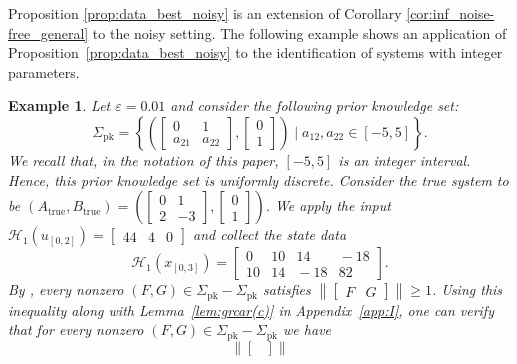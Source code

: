 \documentclass[journal,twoside,web]{ieeecolor}
\newcommand{\set}[2]{\left\{#1 \mid #2\right\}}
\newcommand{\norm}[1]{\left\|#1\right\|}
\newtheorem{example}[theorem]{Example}
\begin{document}
Proposition \ref{prop:data_best_noisy} is an extension of Corollary \ref{cor:inf_noise-free_general} to the noisy setting. The following example shows an application of Proposition~\ref{prop:data_best_noisy} to the identification of systems with integer parameters. 

\begin{example}
\label{ex:UED_noisy_unique}
Let $\varepsilon=0.01$ and consider the following prior knowledge set:
\begin{equation}
\Sigma_\text{pk}=\set{\left(\begin{bmatrix}
0 & 1  \\
a_{21} & a_{22} 
\end{bmatrix},\begin{bmatrix}
0 \\ 1
\end{bmatrix}\right)}{a_{12},a_{22}\in[-5,5]}.
\end{equation}
We recall that, in the notation of this paper, $[-5,5]$ is an integer interval. Hence, this prior knowledge set is uniformly discrete. Consider the true system to be \mbox{$(A_\text{true},B_\text{true})=\left(\begin{bmatrix}
0 & 1  \\
2 & -3 
\end{bmatrix},\begin{bmatrix}
0 \\ 1
\end{bmatrix}\right)$}. We apply the input $\mathcal{H}_1(u_{[0,2]})\!=\!\begin{bmatrix}
44 \!&\! 4 \!&\! 0
\end{bmatrix}$ and collect the state data
\begin{equation}
\mathcal{H}_1(x_{[0,3]})\!=\!\begin{bmatrix}
0 \!&\! 10 \!&\! 14 \!&\! -18 \\
10 \!&\! 14 \!&\! -18 \!&\! 82
\end{bmatrix}.
\end{equation}
By \cite[Fact~11.9.23(xii)]{bernstein2018scalar}, every nonzero \mbox{$(F,G)\in\Sigma_\text{pk}-\Sigma_\text{pk}$} satisfies $\norm{\begin{bmatrix}
F & G
\end{bmatrix}}\geq 1$. Using this inequality along with Lemma~\ref{lem:grcar(c)} in Appendix~\ref{app:I}, one can verify that for every nonzero \mbox{$(F,G)\in\Sigma_\text{pk}-\Sigma_\text{pk}$} we have
\begin{equation}
\norm{\begin{bmatrix}

\end{bmatrix}}
\end{equation}
\end{example}
\end{document}
